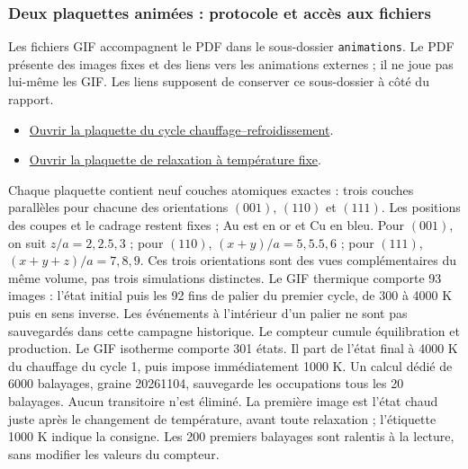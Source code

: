 \subsubsection{Deux plaquettes animées : protocole et accès aux fichiers}
Les fichiers GIF accompagnent le PDF dans le sous-dossier \texttt{animations}. Le PDF présente des images fixes et des liens vers les animations externes ; il ne joue pas lui-même les GIF. Les liens supposent de conserver ce sous-dossier à côté du rapport.
\begin{itemize}
\item \href{animations/plaquette_cycle_thermique.gif}{Ouvrir la plaquette du cycle chauffage--refroidissement}.
\item \href{animations/plaquette_relaxation_isotherme.gif}{Ouvrir la plaquette de relaxation à température fixe}.
\end{itemize}
Chaque plaquette contient neuf couches atomiques exactes : trois couches parallèles pour chacune des orientations $(001)$, $(110)$ et $(111)$. Les positions des coupes et le cadrage restent fixes ; Au est en or et Cu en bleu. Pour $(001)$, on suit $z/a=2,2.5,3$ ; pour $(110)$, $(x+y)/a=5,5.5,6$ ; pour $(111)$, $(x+y+z)/a=7,8,9$. Ces trois orientations sont des vues complémentaires du même volume, pas trois simulations distinctes.
Le GIF thermique comporte 93 images : l'état initial puis les 92 fins de palier du premier cycle, de 300 à 4000 K puis en sens inverse. Les événements à l'intérieur d'un palier ne sont pas sauvegardés dans cette campagne historique. Le compteur cumule équilibration et production.
Le GIF isotherme comporte 301 états. Il part de l'état final à 4000 K du chauffage du cycle 1, puis impose immédiatement 1000 K. Un calcul dédié de 6000 balayages, graine 20261104, sauvegarde les occupations tous les 20 balayages. Aucun transitoire n'est éliminé. La première image est l'état chaud juste après le changement de température, avant toute relaxation ; l'étiquette 1000 K indique la consigne. Les 200 premiers balayages sont ralentis à la lecture, sans modifier les valeurs du compteur.
